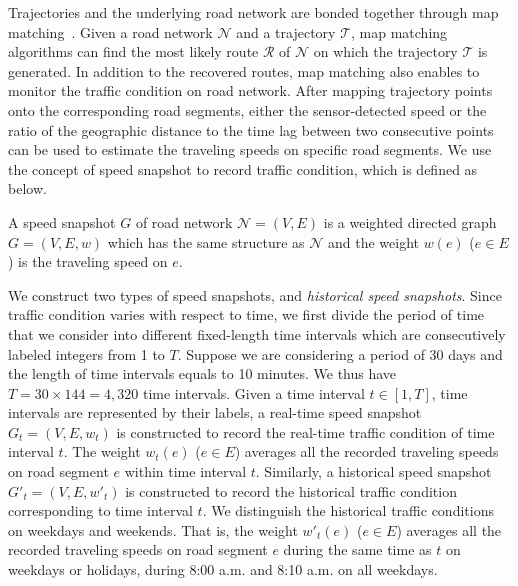 Trajectories and the underlying road network are bonded together through map matching~\cite{Newson2009MM,WuMSZZCWKDD16}. Given a road network $\mathcal{N}$ and a trajectory $\mathcal{T}$, map matching algorithms can find the most likely route $\mathcal{R}$ of $\mathcal{N}$ on which the trajectory $\mathcal{T}$ is generated.
In addition to the recovered routes, map matching also enables to monitor the traffic condition on road network. After mapping trajectory points onto the corresponding road segments, either the sensor-detected speed or the ratio of the geographic distance to the time lag between two consecutive points can be used to estimate the traveling speeds on specific road segments.
We use the concept of speed snapshot to record traffic condition, which is defined as below.

\begin{definition}A speed snapshot $G$ of road network $\mathcal{N}=(V, E)$ is a weighted directed graph $G=(V,E,w)$ which has the same structure as $\mathcal{N}$ and the weight $w(e)$ ($e\in E$) is the traveling speed on $e$.
\end{definition}

We construct two types of speed snapshots,  and {\em historical speed snapshots}. %
%
Since traffic condition varies with respect to time, we first divide the period of time that we consider into different fixed-length time intervals which are consecutively labeled integers from 1 to $T$. Suppose we are considering a period of 30 days and the length of time intervals equals to 10 minutes. We thus have $T=30\times144=4,320$ time intervals.
%
Given a time interval $t\in[1,T]$, \ie time intervals are represented by their labels, a real-time speed snapshot $G_t=(V,E,w_t)$ is constructed to record the real-time traffic condition of time interval $t$. The weight $w_t(e)$ ($e\in E$) averages all the recorded traveling speeds on road segment $e$ within time interval $t$.
%
Similarly, a historical speed snapshot $G'_t=(V,E,w'_t)$ is constructed to record the historical traffic condition corresponding to time interval $t$. We distinguish the historical traffic conditions on weekdays and weekends. That is, the weight $w'_t(e)$ ($e\in E$) averages all the recorded traveling speeds on road segment $e$ during the same time as $t$ on weekdays or holidays, \eg during 8:00 a.m. and 8:10 a.m. on all weekdays. 

